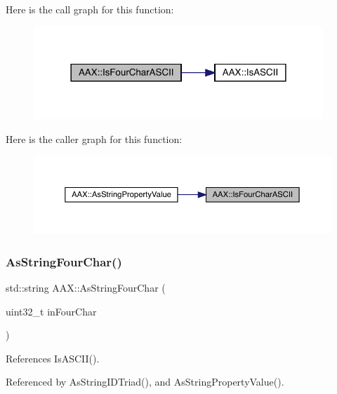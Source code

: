 Here is the call graph for this function\+:
\nopagebreak
\begin{figure}[H]
\begin{center}
\leavevmode
\includegraphics[width=309pt]{a00852_a00fbf59b268ca75214b2dad68be8ff77_cgraph}
\end{center}
\end{figure}
Here is the caller graph for this function\+:
\nopagebreak
\begin{figure}[H]
\begin{center}
\leavevmode
\includegraphics[width=350pt]{a00852_a00fbf59b268ca75214b2dad68be8ff77_icgraph}
\end{center}
\end{figure}
\mbox{\label{a00852_a22eda3cc42cb4ea2192b00bab7a69b02}} 
\subsubsection{\texorpdfstring{AsStringFourChar()}{AsStringFourChar()}}
{\footnotesize\ttfamily std\+::string A\+A\+X\+::\+As\+String\+Four\+Char (\begin{DoxyParamCaption}\item[{uint32\+\_\+t}]{in\+Four\+Char }\end{DoxyParamCaption})\hspace{0.3cm}{\ttfamily [inline]}}



References Is\+A\+S\+C\+I\+I().



Referenced by As\+String\+I\+D\+Triad(), and As\+String\+Property\+Value().

